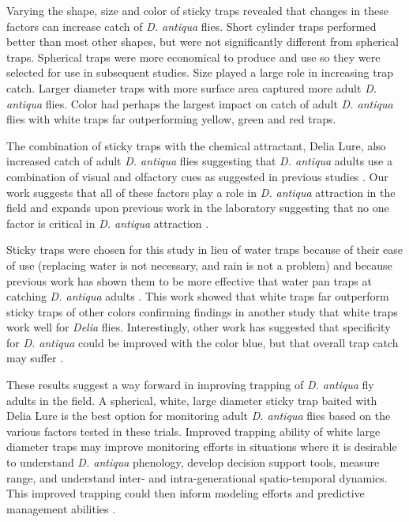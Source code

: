 \documentclass[alpha-refs]{wiley-article}
\begin{document}
Varying the shape, size and color of sticky traps revealed that changes in these factors can increase catch of \textit{D. antiqua} flies.  Short cylinder traps performed better than most other shapes, but were not significantly different from spherical traps.  Spherical traps were more economical to produce and use so they were selected for use in subsequent studies.  Size played a large role in increasing trap catch.  Larger diameter traps with more surface area captured more adult \textit{D. antiqua} flies.  Color had perhaps the largest impact on catch of adult \textit{D. antiqua} flies with white traps far outperforming yellow, green and red traps.  

The combination of sticky traps with the chemical attractant, Delia Lure, also increased catch of adult \textit{D. antiqua} flies suggesting that \textit{D. antiqua} adults use a combination of visual and olfactory cues as suggested in previous studies \citep{harris1983color, harris1988host}.  Our work suggests that all of these factors play a role in \textit{D. antiqua} attraction in the field and expands upon previous work in the laboratory suggesting that no one factor is critical in \textit{D. antiqua} attraction \citep{harris1988host}.  

Sticky traps were chosen for this study in lieu of water traps because of their ease of use (replacing water is not necessary, and rain is not a problem) and because previous work has shown them to be more effective that water pan traps at catching \textit{D. antiqua} adults \citep{thomingdeveloping}.  This work showed that white traps far outperform sticky traps of other colors confirming findings in another study that white traps work well for \textit{Delia} flies.  Interestingly, other work has suggested that specificity for \textit{D. antiqua} could be improved with the color blue, but that overall trap catch may suffer \citep{thomingdeveloping}.   

These results suggest a way forward in improving trapping of \textit{D. antiqua} fly adults in the field. A spherical, white, large diameter sticky trap baited with Delia Lure is the best option for monitoring adult \textit{D. antiqua} flies based on the various factors tested in these trials. Improved trapping ability of white large diameter traps may improve monitoring efforts in situations where it is desirable to understand \textit{D. antiqua} phenology, develop decision support tools, measure range, and understand inter- and intra-generational spatio-temporal dynamics.  This improved trapping could then inform modeling efforts and predictive management abilities \citep{ning2017predicting, otto2000development,thomingdeveloping}.    
\end{document}
